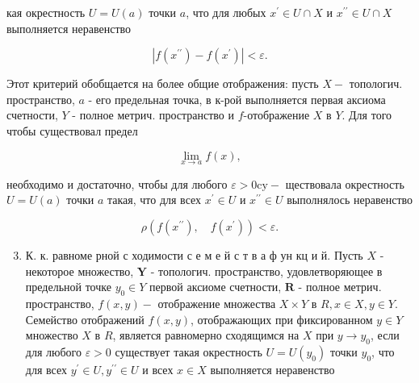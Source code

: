 \documentclass[10pt]{article}
\begin{document}
кая окрестность $U=U(a)$ точки $a$, что для любых $x^{\prime} \in U \cap X$ и $x^{\prime \prime} \in U \cap X$ выполняется неравенство



\[

\left|f\left(x^{\prime \prime}\right)-f\left(x^{\prime}\right)\right|<\varepsilon .

\]



Этот критерий обобщается на более общие отображения: пусть $X-$ топологич. пространство, $a$ - его предельная точка, в к-рой выполняется первая аксиома счетности, $Y$ - полное метрич. пространство и $f$-отображение $X$ в $Y$. Для того чтобы существовал предел



\[

\lim _{x \rightarrow a} f(x),

\]



необходимо и достаточно, чтобы для любого $\varepsilon>0 \mathrm{cy}-$ ществовала окрестность $U=U(a)$ точки $a$ такая, что для всех $x^{\prime} \in U$ и $x^{\prime \prime} \in U$ выполнялось неравенство



\[

\rho\left(f\left(x^{\prime \prime}\right), \quad f\left(x^{\prime}\right)\right)<\varepsilon .

\]



\begin{enumerate}

  \setcounter{enumi}{2}

  \item К. к. равноме рной с ходимости с е м е й с т в а ф ун кц и й. Пусть $X$ - некоторое множество, $\boldsymbol{Y}$ - топологич. пространство, удовлетворяющее в предельной точке $y_{0} \in Y$ первой аксиоме счетности, $\boldsymbol{R}$ - полное метрич. пространство, $f(x, y)-$ отображение множества $X \times Y$ в $R, x \in X, y \in Y$. Семейство отображений $f(x, y)$, отображающих при фиксированном $y \in Y$ множество $X$ в $R$, является равномерно сходящимся на $X$ при $y \rightarrow y_{0}$, если для любого $\varepsilon>0$ существует такая окрестность $U=U\left(y_{0}\right)$ точки $y_{0}$, что для всех $y^{\prime} \in U, y^{\prime \prime} \in U$ и всех $x \in X$ выполняется неравенство

\end{enumerate}
\end{document}
